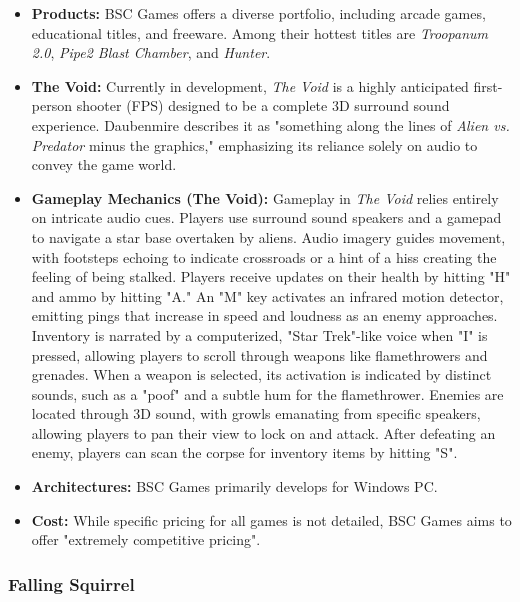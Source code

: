 \begin{itemize}
    \item \textbf{Products:} BSC Games offers a diverse portfolio, including arcade games, educational titles, and freeware. Among their hottest titles are \textit{Troopanum 2.0}, \textit{Pipe2 Blast Chamber}, and \textit{Hunter}\supercite{DigitalStorm2025}.
    \item \textbf{The Void:} Currently in development, \textit{The Void} is a highly anticipated first-person shooter (FPS) designed to be a complete 3D surround sound experience. Daubenmire describes it as "something along the lines of \textit{Alien vs. Predator} minus the graphics," emphasizing its reliance solely on audio to convey the game world\supercite{DigitalStorm2025}.
    \item \textbf{Gameplay Mechanics (The Void):} Gameplay in \textit{The Void} relies entirely on intricate audio cues. Players use surround sound speakers and a gamepad to navigate a star base overtaken by aliens. Audio imagery guides movement, with footsteps echoing to indicate crossroads or a hint of a hiss creating the feeling of being stalked\supercite{DigitalStorm2025}. Players receive updates on their health by hitting "H" and ammo by hitting "A." An "M" key activates an infrared motion detector, emitting pings that increase in speed and loudness as an enemy approaches. Inventory is narrated by a computerized, "Star Trek"-like voice when "I" is pressed, allowing players to scroll through weapons like flamethrowers and grenades\supercite{DigitalStorm2025}. When a weapon is selected, its activation is indicated by distinct sounds, such as a "poof" and a subtle hum for the flamethrower\supercite{DigitalStorm2025}. Enemies are located through 3D sound, with growls emanating from specific speakers, allowing players to pan their view to lock on and attack. After defeating an enemy, players can scan the corpse for inventory items by hitting "S"\supercite{DigitalStorm2025}.
    \item \textbf{Architectures:} BSC Games primarily develops for Windows PC\supercite{DigitalStorm2025}.
    \item \textbf{Cost:} While specific pricing for all games is not detailed, BSC Games aims to offer "extremely competitive pricing"\supercite{DigitalStorm2025}.
\end{itemize}

\subsubsection{Falling Squirrel}

